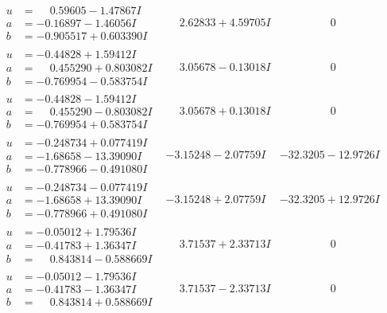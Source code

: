 \documentclass[1p]{elsarticle_modified}
\theoremstyle{definition}
\begin{document}
$$\begin{array}{c|c|c}
\begin{aligned}
u &= \phantom{-}0.59605 - 1.47867 I \\
a &= -0.16897 - 1.46056 I \\
b &= -0.905517 + 0.603390 I\end{aligned}
 & \phantom{-}2.62833 + 4.59705 I & \phantom{-0.000000 } 0 \\ \hline\begin{aligned}
u &= -0.44828 + 1.59412 I \\
a &= \phantom{-}0.455290 + 0.803082 I \\
b &= -0.769954 - 0.583754 I\end{aligned}
 & \phantom{-}3.05678 - 0.13018 I & \phantom{-0.000000 } 0 \\ \hline\begin{aligned}
u &= -0.44828 - 1.59412 I \\
a &= \phantom{-}0.455290 - 0.803082 I \\
b &= -0.769954 + 0.583754 I\end{aligned}
 & \phantom{-}3.05678 + 0.13018 I & \phantom{-0.000000 } 0 \\ \hline\begin{aligned}
u &= -0.248734 + 0.077419 I \\
a &= -1.68658 - 13.39090 I \\
b &= -0.778966 - 0.491080 I\end{aligned}
 & -3.15248 - 2.07759 I & -32.3205 - 12.9726 I \\ \hline\begin{aligned}
u &= -0.248734 - 0.077419 I \\
a &= -1.68658 + 13.39090 I \\
b &= -0.778966 + 0.491080 I\end{aligned}
 & -3.15248 + 2.07759 I & -32.3205 + 12.9726 I \\ \hline\begin{aligned}
u &= -0.05012 + 1.79536 I \\
a &= -0.41783 + 1.36347 I \\
b &= \phantom{-}0.843814 - 0.588669 I\end{aligned}
 & \phantom{-}3.71537 + 2.33713 I & \phantom{-0.000000 } 0 \\ \hline\begin{aligned}
u &= -0.05012 - 1.79536 I \\
a &= -0.41783 - 1.36347 I \\
b &= \phantom{-}0.843814 + 0.588669 I\end{aligned}
 & \phantom{-}3.71537 - 2.33713 I & \phantom{-0.000000 } 0 \\ \hline\begin{aligned}

\end{aligned}
\end{array}$$
\end{document}

